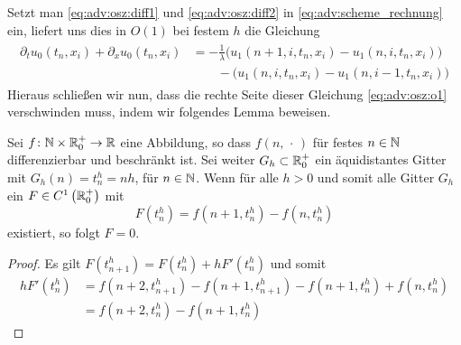 Setzt man \eqref{eq:adv:osz:diff1} und \eqref{eq:adv:osz:diff2} in \eqref{eq:adv:scheme_rechnung} ein, liefert uns dies in $O(1)$ bei festem $h$ die Gleichung
\begin{align}\label{eq:adv:osz:o1}
\begin{split}
\partial_t u_0(t_n, x_i) + \partial_x u_0(t_n, x_i) &= - \frac 1 \lambda \bigl( u_1(n+1, i, t_n, x_i) - u_1(n, i, t_n, x_i) \bigr)\\
&\qquad - \bigl(u_1(n, i, t_n, x_i) - u_1(n, i-1, t_n, x_i) \bigr)
\end{split}
\end{align}
Hieraus schließen wir nun, dass die rechte Seite dieser Gleichung \eqref{eq:adv:osz:o1} verschwinden muss,
indem wir folgendes Lemma beweisen.

\begin{lemma}
Sei $f\colon \mathbb N \times \mathbb R^+_0 \to \mathbb R$ eine Abbildung, so dass $f(n, \,\cdot\,)$ für festes $n \in \mathbb N$ differenzierbar und beschränkt ist.
Sei weiter $G_h \subset \mathbb R^+_0$ ein äquidistantes Gitter mit $G_h(n) = t^h_n = n h$, für $n \in \mathbb N$.
Wenn für alle $h > 0$ und somit alle Gitter $G_h$ ein $F \in C^1\left(\mathbb R^+_0 \right)$ mit
\[ F(t^h_n) = f(n+1, t^h_n) - f(n, t^h_n) \]
existiert, so folgt $F = 0$.
\end{lemma}
\begin{proof}
Es gilt $F(t^h_{n+1}) = F(t^h_n) + h F'(t^h_n)$ und somit
\begin{align}
h F'(t^h_n) &= f(n+2, t^h_{n+1}) - f(n+1, t^h_{n+1}) - f(n+1, t^h_n) + f(n, t^h_n)\\
&= f(n+2, t^h_n) - f(n+1, t^h_n)
\end{align}
\end{proof}